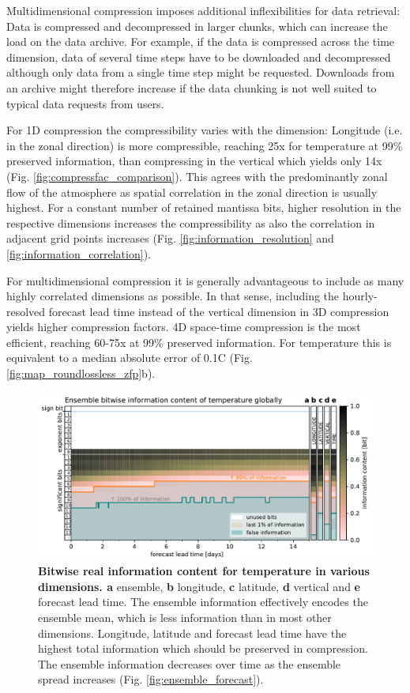 Multidimensional compression imposes additional inflexibilities for data retrieval: Data is compressed and decompressed
in larger chunks, which can increase the load on the data archive. For example, if the data is compressed across the time
dimension, data of several time steps have to be downloaded and decompressed although only data from a single time
step might be requested. Downloads from an archive might therefore increase if the data chunking is not well suited to
typical data requests from users. 

For 1D compression the compressibility varies with the dimension: Longitude (i.e. in the zonal direction) is more compressible,
reaching 25x for temperature at 99\% preserved information, than compressing in the vertical which yields only 14x
(Fig. \ref{fig:compressfac_comparison}). This agrees with the predominantly zonal flow of the atmosphere as spatial
correlation in the zonal direction is usually highest. For a constant number of retained mantissa bits, higher resolution
in the respective dimensions increases the compressibility as also the correlation in adjacent grid points increases
(Fig. \ref{fig:information_resolution} and \ref{fig:information_correlation}).

For multidimensional compression it is generally advantageous to include as many highly correlated dimensions as possible.
In that sense, including the hourly-resolved forecast lead time instead of the vertical dimension in 3D compression yields
higher compression factors. 4D space-time compression is the most efficient, reaching 60-75x at 99\% preserved information.
For temperature this is equivalent to a median absolute error of 0.1\textdegree{}C (Fig. \ref{fig:map_roundlossless_zfp}b).

\begin{figure}[tbhp]
	\includegraphics[width=1\textwidth]{Figures/compression/ensemble_information.pdf}
	\caption{\textbf{Bitwise real information content for temperature in various dimensions. a} ensemble, \textbf{b} longitude,
	\textbf{c} latitude, \textbf{d} vertical and \textbf{e} forecast lead time. The ensemble information effectively encodes the
	ensemble mean, which is less information than in most other dimensions. Longitude, latitude and forecast lead time
	have the highest total information which should be preserved in compression. The ensemble information decreases
	over time as the ensemble spread increases (Fig. \ref{fig:ensemble_forecast}).}
	\label{fig:ensemble_information}
\end{figure}

